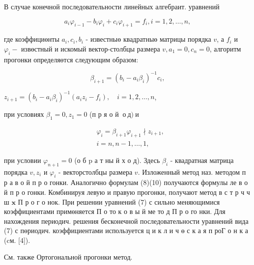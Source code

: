 \documentclass[10pt]{article}
\begin{document}
В случае конечной последовательности линейных алгебраит. уравнений



\[

a_{i} \varphi_{i-1}-b_{i} \varphi_{i}+c_{i} \varphi_{i+1}=f_{i}, i=1,2, \ldots, n,

\]



где коэффициөнты $a_{i}, c_{i}, b_{i}$ - известныө квадратныө матрицы порядка $v$, а $f_{i}$ и $\varphi_{i}-$ извөстный и искомый вектор-столбцы размера $v, a_{1}=0, c_{n}=0$, алгоритм прогонки определяөтся следующим образом:



\[

\beta_{i+1}=\left(b_{i}-a_{i} \beta_{i}\right)^{-1} c_{i},

\]



$z_{i+1}=\left(b_{i}-a_{i} \beta_{i}\right)^{-1}\left(a_{i} z_{i}-f_{i}\right), \quad i=1,2, \ldots, n$,



при условиях $\beta_{1}=0, z_{1}=0$ (п р я о й $\mathbf{~ о ~ д ) ~ и ~}$



\[

\begin{aligned}

& \varphi_{i}=\beta_{i+1} \varphi_{i+1} \nmid z_{i+1}, \\

& i=n, n-1, \ldots, 1,

\end{aligned}

\]



при условии $\varphi_{n+1}=0$ (о б $\mathrm{p}$ а т ны й х о д). Здесь $\beta_{i}$ - квадратная матрица порядка $v, z_{i}$ и $\varphi_{i}$ - векторстолбцы размера $v$. Изложенный метод наз. методом п р а в о й п р о гонки. Аналогично формулам (8)(10) получаются формулы ле в о й п р о гонки. Комбинируя левую и правую прогонки, получают метод в с т р ч ч ш $\mathbf{x}$ П р о г о нок. При решении уравнений (7) с сильно меняющимися коэффициентами примөняется П о то к о в ы й ме то д П р о го нки. Для нахождения периодич. решения бесконечной последовательности уравнений вида (7) с пөриодич. коэффициентами используется ц и к л и ч ө с к а я п роГ о н к а (cм. [4]).



См. также Ортогональной прогонки метод.
\end{document}
